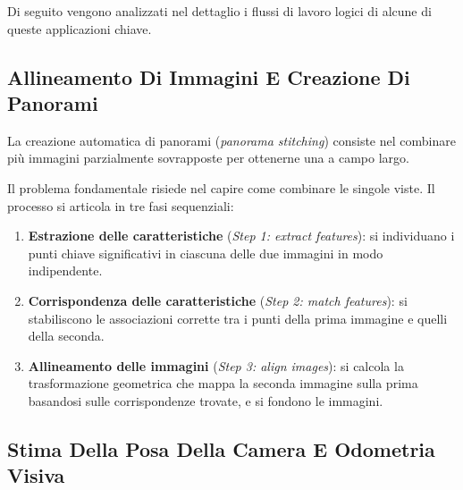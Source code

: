 ﻿\documentclass[11pt, a4paper]{article}
\begin{document}
Di seguito vengono analizzati nel dettaglio i flussi di lavoro logici di alcune di queste applicazioni chiave.

\subsection{Allineamento Di Immagini E Creazione Di Panorami}

La creazione automatica di panorami (\emph{panorama stitching}) consiste nel combinare più immagini parzialmente sovrapposte per ottenerne una a campo largo.


Il problema fondamentale risiede nel capire come combinare le singole viste. Il processo si articola in tre fasi sequenziali:


\begin{enumerate}
    \item \textbf{Estrazione delle caratteristiche} (\emph{Step 1: extract features}): si individuano i punti chiave significativi in ciascuna delle due immagini in modo indipendente.
    \item \textbf{Corrispondenza delle caratteristiche} (\emph{Step 2: match features}): si stabiliscono le associazioni corrette tra i punti della prima immagine e quelli della seconda.


    \item \textbf{Allineamento delle immagini} (\emph{Step 3: align images}): si calcola la trasformazione geometrica che mappa la seconda immagine sulla prima basandosi sulle corrispondenze trovate, e si fondono le immagini.

\end{enumerate}

\subsection{Stima Della Posa Della Camera E Odometria Visiva}
\end{document}
